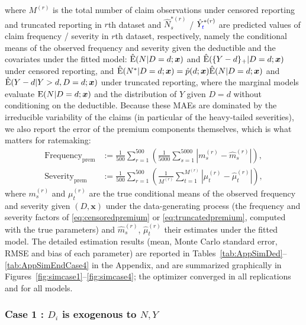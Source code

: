 \documentclass[11pt]{article}
\newcommand{\rev}[1]{{\color{blue}#1}}
\begin{document}
 where $M^{(r)}$ is the total number of \rev{claim} observations under censored reporting and truncated reporting in $r$th dataset and $\hat{N}^{*(r)}_s$ / $\hat{Y}^{*(r)}_{\rev{t}}$ are predicted values of claim frequency / severity in $r$th dataset, respectively\rev{, namely the conditional means of the observed frequency and severity given the deductible and the covariates under the fitted model: $\hat{\rm E}(N|D=d;\bm{x})$ and $\hat{\rm E}(\{Y-d\}_+|D=d;\bm{x})$ under censored reporting, and $\hat{\rm E}(N^*|D=d;\bm{x})=\hat p(d;\bm{x})\hat{\rm E}(N|D=d;\bm{x})$ and $\hat{\rm E}(Y-d|Y>d,D=d;\bm{x})$ under truncated reporting, where the marginal models evaluate ${\rm E}(N|D=d;\bm{x})$ and the distribution of $Y$ given $D=d$ without conditioning on the deductible. Because these MAEs are dominated by the irreducible variability of the claims (in particular of the heavy-tailed severities), we also report the error of the premium components themselves, which is what matters for ratemaking:}
{\color{blue}
\begin{align*}
    \text{Frequency}_{\text{prem}}&:=\frac{1}{500}\sum_{r=1}^{500}\left(\frac{1}{5000}\sum_{s=1}^{5000}|m^{(r)}_s -\hat{m}^{(r)}_s|\right),\\
    \text{Severity}_{\text{prem}}&:=\frac{1}{500}\sum_{r=1}^{500}\left(\frac{1}{M^{(r)}}\sum_{t=1}^{M^{(r)}}|\mu^{(r)}_t -\hat{\mu}^{(r)}_t|\right),
\end{align*}
}
\rev{where $m_s^{(r)}$ and $\mu_t^{(r)}$ are the true conditional means of the observed frequency and severity given $(D,\bm{x})$ under the data-generating process (the frequency and severity factors of \eqref{eq:censoredpremium} or \eqref{eq:truncatedpremium}, computed with the true parameters) and $\hat m_s^{(r)}$, $\hat\mu_t^{(r)}$ their estimates under the fitted model. The detailed estimation results (mean, Monte Carlo standard error, RMSE and bias of each parameter) are reported in Tables~\ref{tab:AppSimDed}--\ref{tab:AppSimEndCase4} in the Appendix, and are summarized graphically in Figures~\ref{fig:simcase1}--\ref{fig:simcase4}; the optimizer converged in all replications and for all models.}%

\subsubsection*{Case 1 : $D_i$ is exogenous to $N, Y$}
\end{document}
